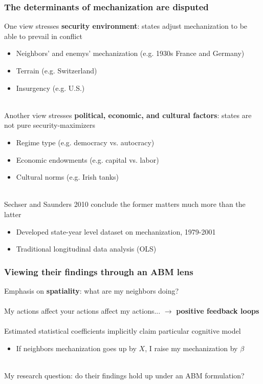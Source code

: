\documentclass{beamer}
\begin{document}
\begin{frame}
	\frametitle{The determinants of mechanization are disputed}
	One view stresses \textbf{security environment}: states adjust
	mechanization to be able to prevail in conflict
	\begin{itemize}
		\item \small Neighbors' and enemys' mechanization (e.g. 1930s
			France and Germany)
		\item \small Terrain (e.g. Switzerland)
		\item \small Insurgency (e.g. U.S.)\\~\\
	\end{itemize}

	Another view stresses \textbf{political, economic, and cultural
	factors}: states are not pure security-maximizers
	\begin{itemize}
		\item \small Regime type (e.g. democracy vs. autocracy)
		\item \small Economic endowments (e.g. capital vs. labor)
		\item \small Cultural norms (e.g. Irish tanks)\\~\\
	\end{itemize}

	Sechser and Saunders 2010 conclude the former matters much more than the
	latter
	\begin{itemize}
		\item \small Developed state-year level dataset on
			mechanization, 1979-2001
		\item \small Traditional longitudinal data analysis (OLS)
	\end{itemize}

\end{frame}

\begin{frame}
	\frametitle{Viewing their findings through an ABM lens}

	Emphasis on \textbf{spatiality}: what are my neighbors doing? \\~\\

	My actions affect your actions affect my actions... $\to$ \textbf{positive feedback loops} \\~\\

	Estimated statistical coefficients implicitly claim particular cognitive model
	\begin{itemize}
		\item \small If neighbors mechanization goes up by $X$, I raise my mechanization by $\beta$ \\~\\
	\end{itemize}

	My research question: do their findings hold up under an ABM formulation?
\end{frame}
\end{document}
